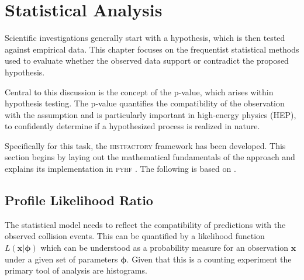 \chapter{Statistical Analysis}\label{sec:statistics}

Scientific investigations generally start with a hypothesis, which is then tested against empirical data. This chapter focuses on the frequentist statistical methods used to evaluate whether the observed data support or contradict the proposed hypothesis.

Central to this discussion is the concept of the p-value, which arises within hypothesis testing. The p-value quantifies the compatibility of the observation with the assumption and is particularly important in high-energy physics (HEP), to confidently determine if a hypothesized process is realized in nature.

Specifically for this task, the \textsc{histfactory} framework has been developed. This section begins by laying out the mathematical fundamentals of the approach and explains its implementation in \textsc{pyhf} \citep{pyhf,pyhf_joss}. The following is based on \citep{cowan2011asymptotic,behnke2013data,pyhf}.



\section{Profile Likelihood Ratio}\label{sec:likelihood}
The statistical model needs to reflect the compatibility of predictions with the observed collision events. This can be quantified by a likelihood function $L(\bm{x} | \bm{\phi})$ which can be understood as a probability measure for an observation $\bm{x}$ under a given set of parameters $\bm{\phi}$. Given that this is a counting experiment the primary tool of analysis are histograms.


